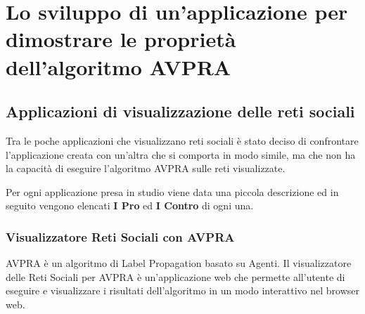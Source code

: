 \documentclass[a4paper,12pt]{report}
\begin{document}
\chapter[Lo sviluppo dell'applicazione]{Lo sviluppo di un'applicazione per dimostrare le proprietà dell'algoritmo AVPRA}

	\section{Applicazioni di visualizzazione delle reti sociali}
		Tra le poche applicazioni che visualizzano reti sociali è stato deciso di confrontare l'applicazione creata con un'altra che si comporta in modo simile, ma che non ha la capacità di eseguire l'algoritmo AVPRA sulle reti visualizzate.

		Per ogni applicazione presa in studio viene data una piccola descrizione ed in seguito vengono elencati \textbf{I Pro} ed \textbf{I Contro} di ogni una.

		\subsection{Visualizzatore Reti Sociali con AVPRA}
		AVPRA è un algoritmo di Label Propagation basato su Agenti.
		Il visualizzatore delle Reti Sociali per AVPRA è un'applicazione web che permette all'utente di
		eseguire e visualizzare i risultati dell'algoritmo in un modo interattivo nel browser web.
		
\end{document}
